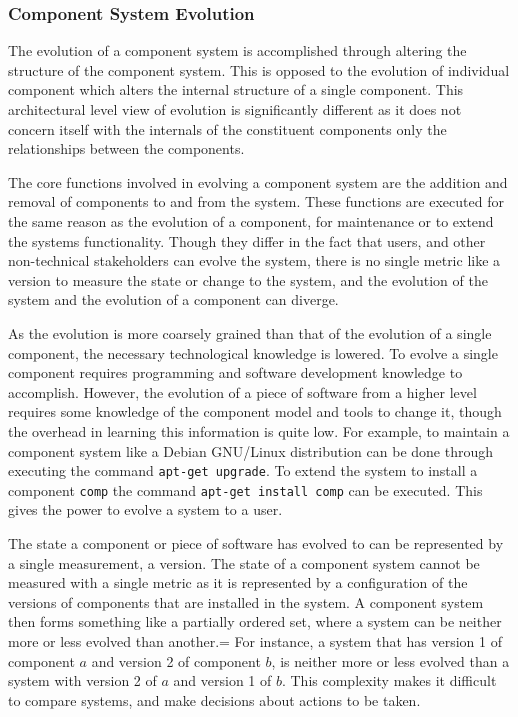 \subsubsection{Component System Evolution}
The evolution of a component system is accomplished through altering the structure of the component system.
This is opposed to the evolution of individual component which alters the internal structure of a single component.
This architectural level view of evolution is significantly different as it does not concern itself with the internals of the constituent components only the relationships between the components.

The core functions involved in evolving a component system are the addition and removal of components to and from the system.
These functions are executed for the same reason as the evolution of a component, for maintenance or to extend the systems functionality.
Though they differ in the fact that users, and other non-technical stakeholders can evolve the system,
there is no single metric like a version to measure the state or change to the system,
and the evolution of the system and the evolution of a component can diverge.
 
As the evolution is more coarsely grained than that of the evolution of a single component, the necessary technological knowledge is lowered.
To evolve a single component requires programming and software development knowledge to accomplish.
However, the evolution of a piece of software from a higher level requires some knowledge of the component model and tools to change it,
though the overhead in learning this information is quite low.
For example, to maintain a component system like a Debian GNU/Linux distribution can be done through executing the command \verb+apt-get upgrade+.
To extend the system to install a component \verb+comp+ the command \verb+apt-get install comp+ can be executed.
This gives the power to evolve a system to a user.

The state a component or piece of software has evolved to can be represented by a single measurement, a version.
The state of a component system cannot be measured with a single metric as it is represented by a configuration of the versions of components that are installed in the system.
A component system then forms something like a partially ordered set, where a system can be neither more or less evolved than another.=
For instance, a system that has version 1 of component $a$ and version 2 of component $b$, is neither more or less evolved than a system with version 2 of $a$ and version 1 of $b$.
This complexity makes it difficult to compare systems, and make decisions about actions to be taken.

